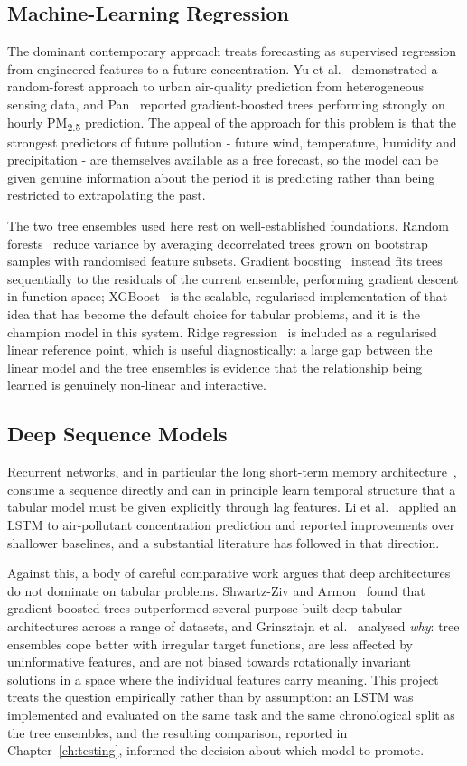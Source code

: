 \subsection{Machine-Learning Regression}
The dominant contemporary approach treats forecasting as supervised regression
from engineered features to a future concentration. Yu et al.~\cite{ref:raq}
demonstrated a random-forest approach to urban air-quality prediction from
heterogeneous sensing data, and Pan~\cite{ref:xgbpm} reported gradient-boosted
trees performing strongly on hourly PM\textsubscript{2.5} prediction. The
appeal of the approach for this problem is that the strongest predictors of
future pollution - future wind, temperature, humidity and precipitation - are
themselves available as a free forecast, so the model can be given genuine
information about the period it is predicting rather than being restricted to
extrapolating the past.

The two tree ensembles used here rest on well-established foundations. Random
forests~\cite{ref:rf} reduce variance by averaging decorrelated trees grown on
bootstrap samples with randomised feature subsets. Gradient boosting~\cite{ref:gb}
instead fits trees sequentially to the residuals of the current ensemble,
performing gradient descent in function space; XGBoost~\cite{ref:xgboost} is the
scalable, regularised implementation of that idea that has become the default
choice for tabular problems, and it is the champion model in this system. Ridge
regression~\cite{ref:ridge} is included as a regularised linear reference point,
which is useful diagnostically: a large gap between the linear model and the tree
ensembles is evidence that the relationship being learned is genuinely non-linear
and interactive.

\subsection{Deep Sequence Models}
Recurrent networks, and in particular the long short-term memory
architecture~\cite{ref:lstm}, consume a sequence directly and can in principle
learn temporal structure that a tabular model must be given explicitly through
lag features. Li et al.~\cite{ref:lstmpm} applied an LSTM to air-pollutant
concentration prediction and reported improvements over shallower baselines, and
a substantial literature has followed in that direction.

Against this, a body of careful comparative work argues that deep architectures do
not dominate on tabular problems. Shwartz-Ziv and Armon~\cite{ref:tabnotall}
found that gradient-boosted trees outperformed several purpose-built deep tabular
architectures across a range of datasets, and Grinsztajn et
al.~\cite{ref:whytrees} analysed \emph{why}: tree ensembles cope better with
irregular target functions, are less affected by uninformative features, and are
not biased towards rotationally invariant solutions in a space where the
individual features carry meaning. This project treats the question empirically
rather than by assumption: an LSTM was implemented and evaluated on the same task
and the same chronological split as the tree ensembles, and the resulting
comparison, reported in Chapter~\ref{ch:testing}, informed the decision about
which model to promote.

